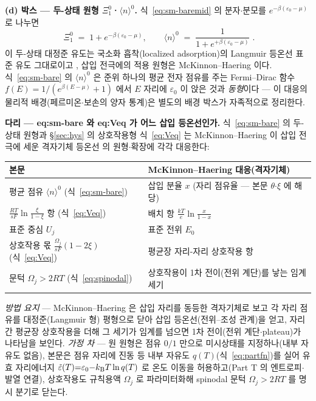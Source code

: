 \textbf{(d) 박스 --- 두-상태 원형 $\Xi_1^{0}$·$\langle n\rangle^{0}$.} 식~\eqref{eq:sm-baremid} 의
분자$\cdot$분모를 $e^{-\beta(\varepsilon_0-\mu)}$ 로 나누면
\begin{equation}
\boxed{\;\Xi_1^{0}\;=\;1+e^{-\beta(\varepsilon_0-\mu)},\qquad
\langle n\rangle^{0}\;=\;\frac{1}{1+e^{+\beta(\varepsilon_0-\mu)}}\;.}
\label{eq:sm-bare}
\end{equation}
이 두-상태 대정준 유도는 국소화 흡착(localized adsorption)의 Langmuir 등온선 표준 유도
그대로이고 \cite{hill1960,fowler1939}, 삽입 전극에의 적용 원형은 McKinnon--Haering
\cite{mckinnon1983} 이다. 식~\eqref{eq:sm-bare} 의 $\langle n\rangle^{0}$ 은 준위 하나의 평균 전자 점유를
주는 Fermi--Dirac 함수 $f(E)=1/(e^{\beta(E-\mu)}+1)$ 에서 $E$ 자리에 $\varepsilon_0$ 이 앉은 것과
\emph{동형}이다 --- 이 대응의 물리적 배경(페르미온$\cdot$보손의 양자 통계)은 별도의 배경 박스가
자족적으로 정리한다.
\begin{srcbox}
\textbf{다리 --- eq:sm-bare 와 eq:Veq 가 어느 삽입 등온선인가.} 식~\eqref{eq:sm-bare} 의 두-상태 원형과
\S\ref{sec:hys} 의 상호작용형 식~\eqref{eq:Veq} 는 McKinnon--Haering 이 삽입 전극에 세운 격자기체
등온선\cite{mckinnon1983} 의 원형$\cdot$확장에 각각 대응한다:
\begin{center}\footnotesize
\begin{tabular}{@{}ll@{}}
\hline
본문 & McKinnon--Haering\cite{mckinnon1983} 대응(격자기체) \\
\hline
평균 점유 $\langle n\rangle^{0}$ (식~\eqref{eq:sm-bare}) & 삽입 분율 $x$ (자리 점유율 --- 본문 $\theta$$\cdot$$\xi$ 에 해당) \\
$\tfrac{RT}{sF}\ln\tfrac{\xi}{1-\xi}$ 항 (식~\eqref{eq:Veq}) & 배치 항 $\tfrac{kT}{e}\ln\tfrac{x}{1-x}$ \\
표준 중심 $U_j$ & 표준 전위 $E_0$ \\
상호작용 몫 $\tfrac{\Omega_j}{sF}(1-2\xi)$ (식~\eqref{eq:Veq}) & 평균장 자리-자리 상호작용 항 \\
문턱 $\Omega_j>2RT$ (식~\eqref{eq:spinodal}) & 상호작용이 1차 전이(전위 계단)를 낳는 임계 세기 \\
\hline
\end{tabular}
\end{center}
\emph{방법 요지} --- McKinnon--Haering 은 삽입 자리를 동등한 격자기체로 보고 각 자리 점유를 대정준(Langmuir
형) 평형으로 닫아 삽입 등온선(전위--조성 관계)을 얻고, 자리 간 평균장 상호작용을 더해 그 세기가 임계를
넘으면 1차 전이(전위 계단$\cdot$plateau)가 나타남을 보인다. \emph{가정 차} --- 원 원형은 점유 $0/1$ 만으로
미시상태를 지정하나(내부 자유도 없음), 본문은 점유 자리에 진동 등 내부 자유도 $q(T)$(식~\eqref{eq:partfn})를
실어 유효 자리에너지 $\tilde\varepsilon(T){=}\varepsilon_0{-}k_{\mathrm B} T\ln q(T)$ 로 온도 이동을 허용하고(Part T 의
엔트로피$\cdot$발열 연결), 상호작용도 규칙용액 $\Omega_j$ 로 파라미터화해 spinodal 문턱 $\Omega_j{>}2RT$ 를
명시 분기로 닫는다.
\end{srcbox}

